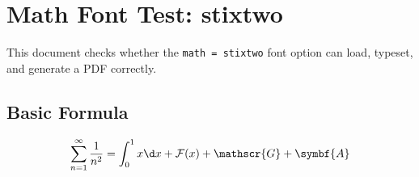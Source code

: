 \documentclass[lang = en, math = stixtwo, font = none, mode = simple]{elegantbook-l3}
\begin{document}
\frontmatter
\tableofcontents

\mainmatter
\chapter{Math Font Test: stixtwo}

This document checks whether the \texttt{math = stixtwo} font option can load,
typeset, and generate a PDF correctly.

\section{Basic Formula}

\[
  \sum_{n=1}^{\infty} \frac{1}{n^2}
  =
  \int_0^1 x\d x + \mathcal{F}(x) + \mathscr{G} + \symbf{A}
\]
\end{document}
